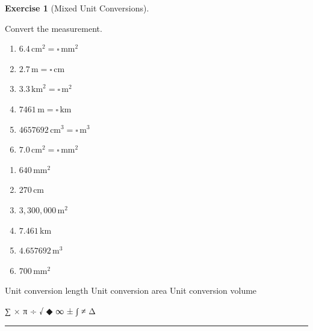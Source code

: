 \documentclass[
  letterpaper,
  DIV=11,
  numbers=noendperiod]{scrreprt}
\theoremstyle{definition}
\newtheorem{exercise}{Exercise}[chapter]
\theoremstyle{remark}
\begin{document}
\begin{exercise}[Mixed Unit
Conversions]\protect\hypertarget{exr-conv-4}{}\label{exr-conv-4}

Convert the measurement.

\begin{enumerate}
\def\labelenumi{\alph{enumi})}
\item
  \(6.4\,\text{cm}^{2} = \square\,\text{mm}^{2}\)
\item
  \(2.7\,\text{m} = \square\,\text{cm}\)
\item
  \(3.3\,\text{km}^{2} = \square\,\text{m}^{2}\)
\item
  \(7461\,\text{m} = \square\,\text{km}\)
\item
  \(4657692\,\text{cm}^{3} = \square\,\text{m}^{3}\)
\item
  \(7.0\,\text{cm}^{2} = \square\,\text{mm}^{2}\)
\end{enumerate}

\begin{tcolorbox}[enhanced jigsaw, opacitybacktitle=0.6, coltitle=black, arc=.35mm, colframe=quarto-callout-tip-color-frame, colback=white, bottomrule=.15mm, left=2mm, colbacktitle=quarto-callout-tip-color!10!white, titlerule=0mm, opacityback=0, title=\textcolor{quarto-callout-tip-color}{\faLightbulb}\hspace{0.5em}{🔍 View Solution}, leftrule=.75mm, breakable, rightrule=.15mm, bottomtitle=1mm, toptitle=1mm, toprule=.15mm]

\begin{enumerate}
\def\labelenumi{\alph{enumi})}
\item
  \(640\,\text{mm}^{2}\)
\item
  \(270\,\text{cm}\)
\item
  \(3{,}300{,}000\,\text{m}^{2}\)
\item
  \(7.461\,\text{km}\)
\item
  \(4.657692\,\text{m}^{3}\)
\item
  \(700\,\text{mm}^{2}\)
\end{enumerate}

\end{tcolorbox}

{Unit conversion length} {Unit conversion area} {Unit conversion volume}

\end{exercise}

∑ × π ÷ √ ◆ ∞ ± ∫ ≠ Δ

\begin{center}\rule{0.5\linewidth}{0.5pt}\end{center}
\end{document}
